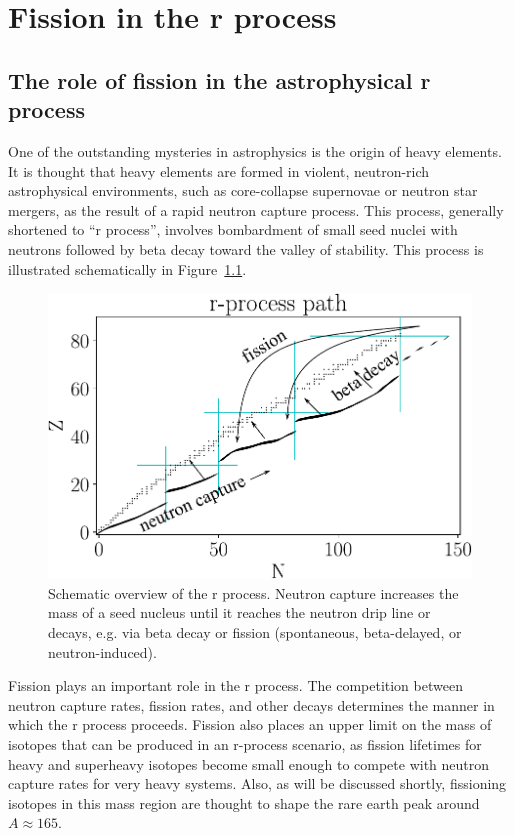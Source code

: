 \chapter{Fission in the r process}\label{chap:rprocess}

\section{The role of fission in the astrophysical r process}
One of the outstanding mysteries in astrophysics is the origin of heavy elements. It is thought that heavy elements are formed in violent, neutron-rich astrophysical environments, such as core-collapse supernovae or neutron star mergers, as the result of a rapid neutron capture process. This process, generally shortened to ``r process'', involves bombardment of small seed nuclei with neutrons followed by beta decay toward the valley of stability.  This process is illustrated schematically in Figure~\ref{fig:rprocpath}.

\begin{figure}
	\centering
	\includegraphics[width=0.8\linewidth]{TeX_files/rProc_path}
	\caption[Schematic overview of the r process]{Schematic overview of the r process. Neutron capture increases the mass of a seed nucleus until it reaches the neutron drip line or decays, e.g. via beta decay or fission (spontaneous, beta-delayed, or neutron-induced).}
	\label{fig:rprocpath}
\end{figure}

Fission plays an important role in the r process. The competition between neutron capture rates, fission rates, and other decays determines the manner in which the r process proceeds. Fission also places an upper limit on the mass of isotopes that can be produced in an r-process scenario, as fission lifetimes for heavy and superheavy isotopes become small enough to compete with neutron capture rates for very heavy systems. Also, as will be discussed shortly, fissioning isotopes in this mass region are thought to shape the rare earth peak around $A\approx165$.

